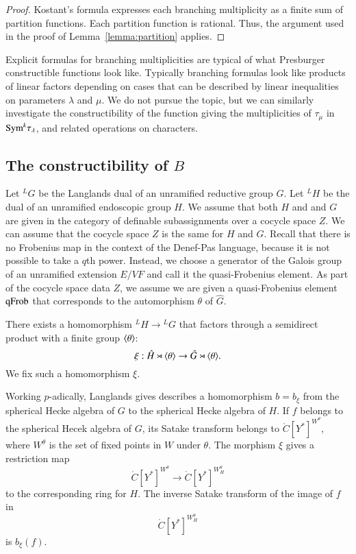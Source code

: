 \begin{proof}  Kostant's formula expresses each branching multiplicity as a finite sum of partition
functions.  Each partition function is rational.  
Thus, the argument used in the proof of Lemma~\ref{lemma:partition} applies.
\end{proof}

Explicit formulas for branching multiplicities are typical of what Presburger constructible functions look like.
Typically branching formulas look like products of linear factors depending on cases that can be
described by linear inequalities on parameters $\lambda$ and $\mu$.
We do not pursue the topic, but we can similarly investigate the constructibility of the function giving the
multiplicities of $\tau_\mu$ in ${\operatorname{Sym}}^k \tau_\lambda$, and related operations on characters.

\subsection{The constructibility of $B$}\label{sec:B}

Let ${}^LG$ be the Langlands dual of an unramified reductive group $G$.  Let ${}^LH$ be the dual of an
unramified endoscopic group $H$.  We assume that both $H$ and and $G$ are given in the category of definable subassignments
over a cocycle space $Z$.  We can assume that the cocycle space $Z$ is the same for $H$ and $G$.
Recall that there is no Frobenius map in the context of the Denef-Pas language, because it is not possible to take a $q$th power.
Instead, we choose a generator of the Galois group of an unramified extension $E/VF$ and call it the quasi-Frobenius element.
As part of the cocycle space data $Z$, we assume we are given a quasi-Frobenius element ${\operatorname{qFrob}}$ that corresponds
to the automorphism $\theta$ of $\hat G$.  

There exists a homomorphism ${}^LH\to {}^LG$ that factors through a semidirect product with a finite group $\langle{\theta}\rangle$:
\[
\xi:\hat H \rtimes \langle{\theta}\rangle \to \hat G \rtimes \langle{\theta}\rangle.
\]
We fix such a homomorphism $\xi$.  

Working $p$-adically, Langlands gives describes a homomorphism $b = b_\xi$
from the spherical Hecke algebra of $G$ to the spherical Hecke algebra of $H$.
If $f$ belongs to the spherical Hecek algebra of $G$, its Satake transform belongs
to $\ring{C}[Y^*]^{W^\theta}$, where $W^\theta$ is the set of fixed points in $W$ under $\theta$.
The morphism $\xi$ gives a restriction map
\[
\ring{C}[Y^*]^{W^\theta} \to \ring{C}[Y^*]^{W_H^\theta}
\]
to the corresponding ring for $H$.  The inverse Satake transform of the image of $f$ in
\[
\ring{C}[Y^*]^{W_H^\theta}
\]
is $b_\xi(f)$.

